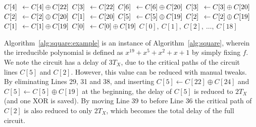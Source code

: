 \documentclass{ufscThesis}
\newcommand{\mathbox}[3][l]{\makebox[\widthof{$#2$}][#1]{$#3$}}
\begin{document}
\begin{appendices}
\begin{algorithm}
\begin{multicols}{2}
\begin{algorithmic}[1]
\STATE $\mathbox{C[22]}{C[4]} \leftarrow C[4]  \oplus  C[22]$
\STATE $\mathbox{C[22]}{C[3]} \leftarrow C[22]$
\STATE $\mathbox{C[22]}{C[6]} \leftarrow C[6]  \oplus  C[20]$
\STATE $\mathbox{C[22]}{C[3]} \leftarrow C[3]  \oplus  C[20]$
\STATE $\mathbox{C[22]}{C[2]} \leftarrow C[2]  \oplus  C[20]$
\STATE $\mathbox{C[22]}{C[1]} \leftarrow C[20]$
\STATE $\mathbox{C[22]}{C[5]} \leftarrow C[5]  \oplus  C[19]$
\STATE $\mathbox{C[22]}{C[2]} \leftarrow C[2]  \oplus  C[19]$
\STATE $\mathbox{C[22]}{C[1]} \leftarrow C[1]  \oplus  C[19]$
\STATE $\mathbox{C[22]}{C[0]} \leftarrow C[0]  \oplus  C[19]$
\RETURN $C[0],~C[1],~C[2],~\ldots,~C[18]$
\end{algorithmic}
\end{multicols}
\end{algorithm}

Algorithm~\ref{alg:square:example} is an instance of Algorithm~\ref{alg:square}, wherein the irreducible polynomial is defined as $x^{19}+x^5+x^2+x+1$ by simply fixing $f$. We note the circuit has a delay of $3T_X$, due to the critical paths of the circuit lines $C[5]$ and $C[2]$. However, this value can be reduced with manual tweaks. By eliminating Lines 29, 31 and 38, and inserting $C[5] \leftarrow C[22] \oplus C[24]$ and $C[5] \leftarrow C[5] \oplus C[19]$ at the beginning, the delay of $C[5]$ is reduced to $2 T_X$ (and one XOR is saved). By moving Line 39 to before Line 36 the critical path of $C[2]$ is also reduced to only $2 T_X$, which becomes the total delay of the full circuit.

\end{appendices}
\end{document}
